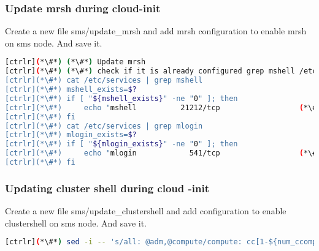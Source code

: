 \subsubsection{Update mrsh during cloud-init}
 
Create a new file sms/update\_mrsh and add mrsh configuration to enable mrsh on sms node. And save it. 


\begin{lstlisting}[language=bash,keywords={}]
[ctrlr](*\#*) (*\#*) Update mrsh
[ctrlr](*\#*) (*\#*) check if it is already configured grep mshell /etc/services will return non-zero, else configure"
[ctrlr](*\#*) cat /etc/services | grep mshell
[ctrlr](*\#*) mshell_exists=$?
[ctrlr](*\#*) if [ "${mshell_exists}" -ne "0" ]; then
[ctrlr](*\#*)     echo "mshell          21212/tcp                  (*\#*) mrshd" >> /etc/services
[ctrlr](*\#*) fi
[ctrlr](*\#*) cat /etc/services | grep mlogin
[ctrlr](*\#*) mlogin_exists=$?
[ctrlr](*\#*) if [ "${mlogin_exists}" -ne "0" ]; then
[ctrlr](*\#*)     echo "mlogin            541/tcp                  (*\#*) mrlogind" >> /etc/services
[ctrlr](*\#*) fi
\end{lstlisting} 


\subsubsection{Updating cluster shell during cloud -init}
Create a new file sms/update\_clustershell and add configuration to enable clustershell on sms node. And save it. 



\begin{lstlisting}[language=bash,keywords={}]
[ctrlr](*\#*) sed -i -- 's/all: @adm,@compute/compute: cc[1-${num_ccomputes}]\n&/' /etc/clustershell/groups.d/local.cfg
\end{lstlisting} 
